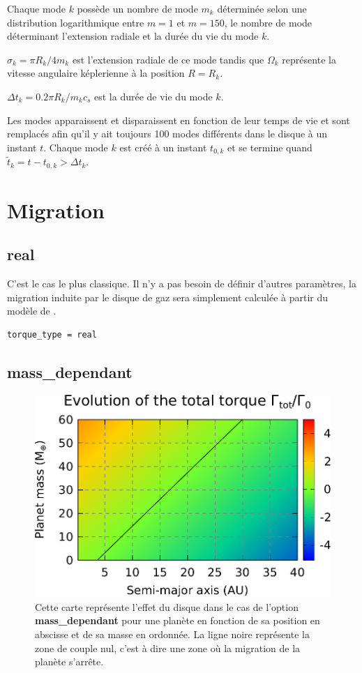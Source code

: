 Chaque mode $k$ possède un nombre de mode $m_k$ déterminée selon une distribution logarithmique entre $m=1$ et $m=150$, le nombre de mode déterminant l'extension radiale et la durée du vie du mode $k$.

$\sigma_k = \pi R_k / 4m_k$ est l'extension radiale de ce mode tandis que $\Omega_k$ représente la vitesse angulaire képlerienne à la position $R=R_k$.

$\Delta t_k=0.2\pi R_k / m_k c_s$ est la durée de vie du mode $k$. 

\bigskip

Les modes apparaissent et disparaissent en fonction de leur temps de vie et sont remplacés afin qu'il y ait toujours 100 modes différents dans le disque à un instant $t$. Chaque mode $k$ est créé à un instant $t_{0,k}$ et se termine quand $\tilde{t}_k = t-t_{0,k} > \Delta t_k$.

\section{Migration}
\subsection{real}
C'est le cas le plus classique. Il n'y a pas besoin de définir d'autres paramètres, la migration induite par le disque de gaz sera simplement calculée à partir du modèle de \cite{paardekooper2011torque}.

\begin{verbatim}
torque_type = real
\end{verbatim}

\subsection{mass\_dependant}\label{sec:mass_dependant}
\begin{figure}[htbp]
\centering
\includegraphics[width=0.65\linewidth]{figure/migration_map/mass_dependant.pdf}
\caption{Cette carte représente l'effet du disque dans le cas de l'option \textbf{mass\_dependant} pour une planète en fonction de sa position en abscisse et de sa masse en ordonnée. La ligne noire représente la zone de couple nul, c'est à dire une zone où la migration de la planète s'arrête.}
\end{figure}

